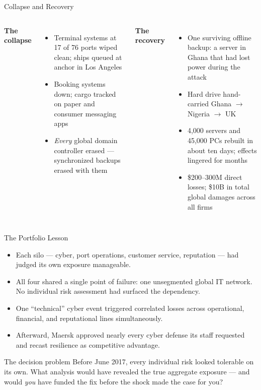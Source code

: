 \documentclass[11pt, aspectratio=169]{beamer}
\begin{document}
\begin{frame}{Collapse and Recovery}
\begin{columns}[T]
\textbf{The collapse}
\begin{itemize}
  \item Terminal systems at 17 of 76 ports wiped clean; ships queued at anchor in Los Angeles
  \item Booking systems down; cargo tracked on paper and consumer messaging apps
  \item \emph{Every} global domain controller erased --- synchronized backups erased with them
\end{itemize}
\textbf{The recovery}
\begin{itemize}
  \item One surviving offline backup: a server in Ghana that had lost power during the attack
  \item Hard drive hand-carried Ghana $\rightarrow$ Nigeria $\rightarrow$ UK
  \item 4{,}000 servers and 45{,}000 PCs rebuilt in about ten days; effects lingered for months
  \item \$200--300M direct losses; \$10B in total global damages across all firms
\end{itemize}
\end{columns}
\end{frame}

\begin{frame}{The Portfolio Lesson}
\begin{itemize}
  \item Each silo --- cyber, port operations, customer service, reputation --- had judged its own exposure manageable.
  \item All four shared a single point of failure: one unsegmented global IT network. No individual risk assessment had surfaced the dependency.
  \item One ``technical'' cyber event triggered \alert{correlated losses} across operational, financial, and reputational lines simultaneously.
  \item Afterward, Maersk approved nearly every cyber defense its staff requested and recast resilience as competitive advantage.
\end{itemize}
\medskip
\begin{block}{The decision problem}
Before June 2017, every individual risk looked tolerable on its own. What analysis would have revealed the true aggregate exposure --- and would \emph{you} have funded the fix before the shock made the case for you?
\end{block}
\end{frame}
\end{document}
